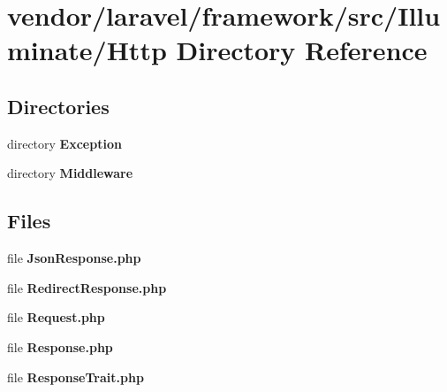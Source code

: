\section{vendor/laravel/framework/src/\+Illuminate/\+Http Directory Reference}
\label{dir_d1d5f8afdc08d1970a4a93ac93ff9fc7}
\subsection*{Directories}
\begin{DoxyCompactItemize}
\item 
directory {\bf Exception}
\item 
directory {\bf Middleware}
\end{DoxyCompactItemize}
\subsection*{Files}
\begin{DoxyCompactItemize}
\item 
file {\bf Json\+Response.\+php}
\item 
file {\bf Redirect\+Response.\+php}
\item 
file {\bf Request.\+php}
\item 
file {\bf Response.\+php}
\item 
file {\bf Response\+Trait.\+php}
\end{DoxyCompactItemize}
